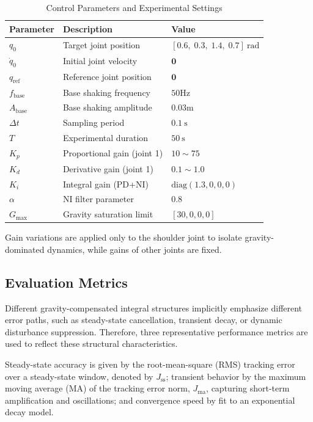 \documentclass[conference]{IEEEtran}
\begin{document}
\begin{table}[t]
	\centering
	\caption{Control Parameters and Experimental Settings}
	\label{tab:control_exp_params}
	\begin{tabular}{lll}
		\hline
		Parameter & Description & Value \\
		\hline
		$q_0$     & Target joint position        & $[0.6,\;0.3,\;1.4,\;0.7]~\mathrm{rad}$ \\
		$\dot q_0$& Initial joint velocity        & $\mathbf{0}$ \\
		$q_{\mathrm{ref}}$ & Reference joint position & $\mathbf{0}$ \\
		$f_{\mathrm{base}}$ & Base shaking frequency & $ 50\mathrm{Hz}$ \\
		$A_{\mathrm{base}}$ & Base shaking amplitude & $0.03\mathrm{m}$ \\
		$\Delta t$& Sampling period               & $0.1~\mathrm{s}$ \\
		$T$       & Experimental duration           & $50~\mathrm{s}$ \\
		$K_p$     & Proportional gain (joint 1)   & $10 \sim 75$ \\
		$K_d$     & Derivative gain (joint 1)     & $0.1 \sim 1.0$ \\
		$K_i$     & Integral gain (PD+NI)         & $\mathrm{diag}(1.3,0,0,0)$ \\
		$\alpha$  & NI filter parameter           & $0.8$ \\
		$G_{\max}$& Gravity saturation limit      & $[30,0,0,0]$ \\
		\hline
	\end{tabular}
\end{table}
Gain variations are applied only to the shoulder joint to isolate gravity-dominated dynamics, while gains of other joints are fixed.

\subsection{Evaluation Metrics}
 Different gravity-compensated integral structures implicitly emphasize different error paths, such as steady-state cancellation, transient decay, or dynamic disturbance suppression. Therefore, three representative performance metrics are used to reflect these structural characteristics.

Steady-state accuracy is given by the root-mean-square (RMS) tracking error over a steady-state window, denoted by $J_{\mathrm{ss}}$; transient behavior by the maximum moving average (MA) of the tracking error norm, $J_{\mathrm{ma}}$, capturing short-term amplification and oscillations; and convergence speed by fit to an exponential decay model.
\end{document}
